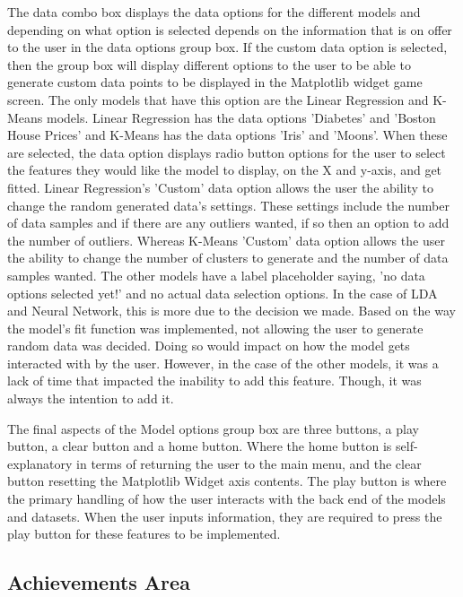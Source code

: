 	
		The data combo box displays the data options for the different models and depending on what option is selected depends on the information that is on offer to the user in the data options group box. If the custom data option is selected, then the group box will display different options to the user to be able to generate custom data points to be displayed in the Matplotlib widget game screen. The only models that have this option are the Linear Regression and K-Means models. Linear Regression has the data options 'Diabetes' and 'Boston House Prices' and K-Means has the data options 'Iris' and 'Moons'. When these are selected, the data option displays radio button options for the user to select the features they would like the model to display, on the X and y-axis, and get fitted. Linear Regression's 'Custom' data option allows the user the ability to change the random generated data's settings. These settings include the number of data samples and if there are any outliers wanted, if so then an option to add the number of outliers. Whereas K-Means 'Custom' data option allows the user the ability to change the number of clusters to generate and the number of data samples wanted. The other models have a label placeholder saying, 'no data options selected yet!' and no actual data selection options. In the case of LDA and Neural Network, this is more due to the decision we made. Based on the way the model's fit function was implemented, not allowing the user to generate random data was decided. Doing so would impact on how the model gets interacted with by the user. However, in the case of the other models, it was a lack of time that impacted the inability to add this feature. Though, it was always the intention to add it.
		
		The final aspects of the Model options group box are three buttons, a play button, a clear button and a home button. Where the home button is self-explanatory in terms of returning the user to the main menu, and the clear button resetting the Matplotlib Widget axis contents. The play button is where the primary handling of how the user interacts with the back end of the models and datasets. When the user inputs information, they are required to press the play button for these features to be implemented.
	
	
	
	\subsection{Achievements Area}
	

